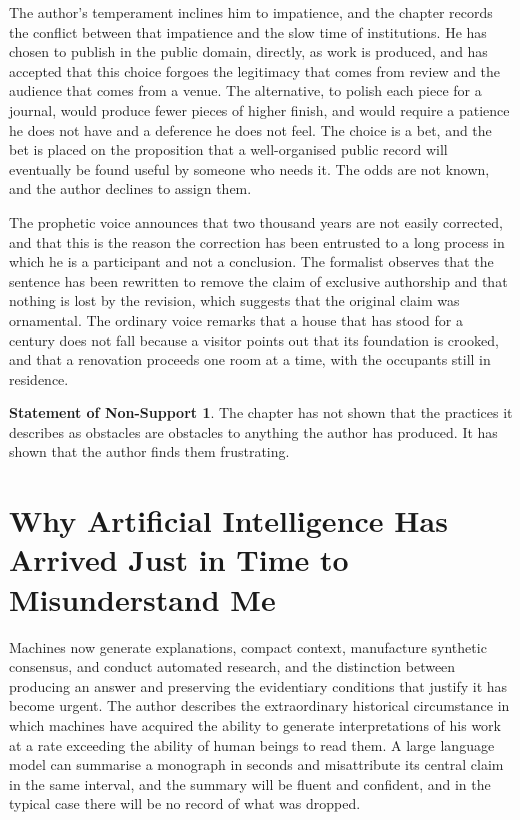 \documentclass[11pt,openany,twoside]{book}
\theoremstyle{plain}
\theoremstyle{definition}
\newtheorem{nonsupport}{Statement of Non-Support}
\theoremstyle{remark}
\begin{document}
The author's temperament inclines him to impatience, and the chapter records the conflict between that impatience and the slow time of institutions. He has chosen to publish in the public domain, directly, as work is produced, and has accepted that this choice forgoes the legitimacy that comes from review and the audience that comes from a venue. The alternative, to polish each piece for a journal, would produce fewer pieces of higher finish, and would require a patience he does not have and a deference he does not feel. The choice is a bet, and the bet is placed on the proposition that a well-organised public record will eventually be found useful by someone who needs it. The odds are not known, and the author declines to assign them.

The prophetic voice announces that two thousand years are not easily corrected, and that this is the reason the correction has been entrusted to a long process in which he is a participant and not a conclusion. The formalist observes that the sentence has been rewritten to remove the claim of exclusive authorship and that nothing is lost by the revision, which suggests that the original claim was ornamental. The ordinary voice remarks that a house that has stood for a century does not fall because a visitor points out that its foundation is crooked, and that a renovation proceeds one room at a time, with the occupants still in residence.

\begin{nonsupport}
The chapter has not shown that the practices it describes as obstacles are obstacles to anything the author has produced. It has shown that the author finds them frustrating.
\end{nonsupport}

\chapter{Why Artificial Intelligence Has Arrived Just in Time to Misunderstand Me}

Machines now generate explanations, compact context, manufacture synthetic consensus, and conduct automated research, and the distinction between producing an answer and preserving the evidentiary conditions that justify it has become urgent. The author describes the extraordinary historical circumstance in which machines have acquired the ability to generate interpretations of his work at a rate exceeding the ability of human beings to read them. A large language model can summarise a monograph in seconds and misattribute its central claim in the same interval, and the summary will be fluent and confident, and in the typical case there will be no record of what was dropped.
\end{document}
